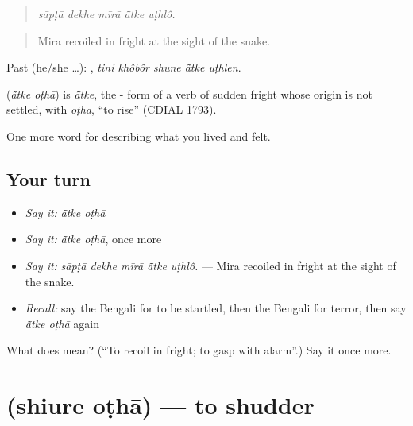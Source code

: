 \begin{quote}
    
\end{quote}

\begin{quote}
\emph{sāpṭā dekhe mīrā ā̃tke uṭhlô.}
\end{quote}

\begin{quote}
Mira recoiled in fright at the sight of the snake.
\end{quote}

Past (he/she …):     , \emph{tini khôbôr shune ā̃tke uṭhlen}.

\begin{cousinweb}
\textbf{ } (\emph{ā̃tke oṭhā}) is \emph{ā̃tke}, the - form of a verb of sudden fright whose origin is not settled, with \emph{oṭhā}, \textquotedblleft{}to rise\textquotedblright{} (CDIAL 1793).
\end{cousinweb}

\begin{grammarlens}[title={What you've built}]
One more word for describing what you lived and felt.
\end{grammarlens}

\subsection*{Your turn}
\begin{itemize}
\raggedright
  \item \emph{Say it:} \emph{ā̃tke oṭhā}
  \item \emph{Say it:} \emph{ā̃tke oṭhā}, once more
  \item \emph{Say it:} \emph{sāpṭā dekhe mīrā ā̃tke uṭhlô.} — Mira recoiled in fright at the sight of the snake.
  \item \emph{Recall:} say the Bengali for to be startled, then the Bengali for terror, then say \emph{ā̃tke oṭhā} again
\end{itemize}

\begin{tcolorbox}[breakable,colback=teal!4,colframe=teal!35!black,title={Before you move on}]
What does   mean? (\textquotedblleft{}To recoil in fright; to gasp with alarm\textquotedblright{}.) Say it once more.
\end{tcolorbox}
\section[\texorpdfstring{\bn{শিউরে} \bn{ওঠা} (shiure oṭhā)}{শিউরে ওঠা (shiure oṭhā)}]{  (shiure oṭhā) — to shudder}

